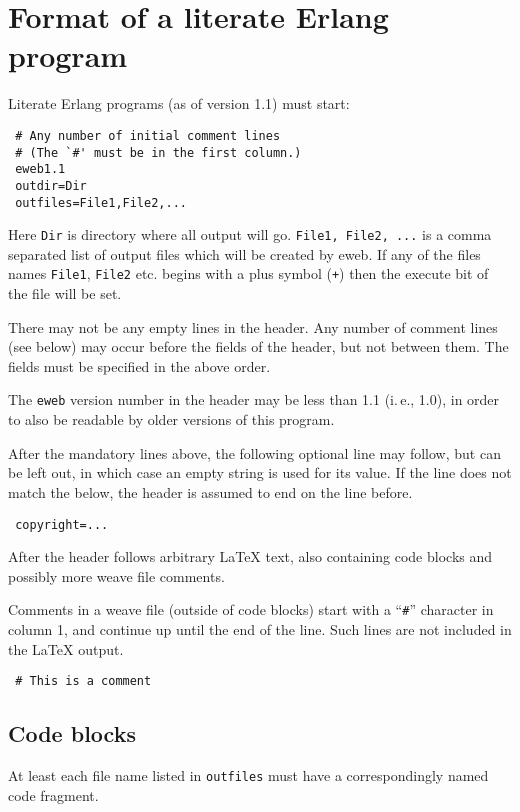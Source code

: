 \section*{Format of a literate Erlang program}

Literate Erlang programs (as of version 1.1) must start:
\begin{verbatim}
 # Any number of initial comment lines
 # (The `#' must be in the first column.)
 eweb1.1
 outdir=Dir
 outfiles=File1,File2,...
\end{verbatim}

    Here   \verb+Dir+   is   directory where   all  output   will  go.
\verb+File1, File2, ...+  is a comma separated   list of output  files
which will be created by eweb. If any of the files names \verb+File1+,
\verb+File2+   etc. begins  with  a plus   symbol (\verb|+|) then  the
execute bit of the file will be set.

There may not be any empty lines in the header. Any number of comment
lines (see below) may occur before the fields of the header, but not
between them. The fields must be specified in the above order.

The \verb+eweb+ version number in the header may be less than 1.1
(i.\,e., 1.0), in order to also be readable by older versions of this
program.

After the mandatory lines above, the following optional line may follow,
but can be left out, in which case an empty string is used for its
value. If the line does not match the below, the header is assumed to
end on the line before.
\begin{verbatim}
 copyright=...
\end{verbatim}

After the header follows arbitrary \LaTeX{} text, also containing code
blocks and possibly more weave file comments.

  Comments in a weave file (outside of code blocks) start with a
``\verb+#+'' character in column 1, and continue up until the end of the
line. Such lines are not included in the \LaTeX{} output.

\begin{verbatim}
 # This is a comment
\end{verbatim}

\subsection*{Code blocks}

At least each file name listed in \verb+outfiles+ must have a
correspondingly named code fragment.

